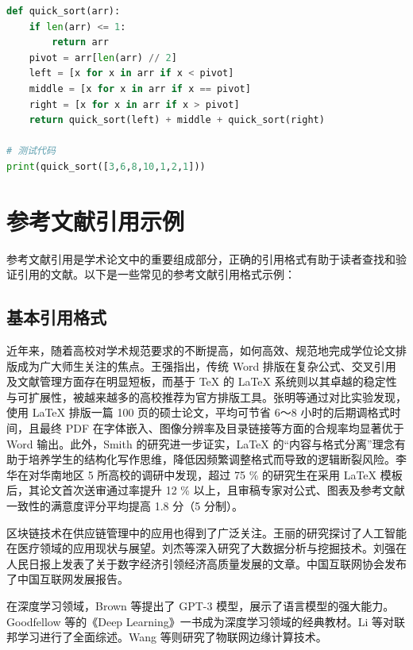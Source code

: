 \documentclass[UTF8,AutoFakeBold=1,AutoFakeSlant,zihao=-4]{SCAU}
\begin{document}
\begin{lstlisting}[language=Python, caption={快速排序算法 (Python 实现)}]
def quick_sort(arr):
    if len(arr) <= 1:
        return arr
    pivot = arr[len(arr) // 2]
    left = [x for x in arr if x < pivot]
    middle = [x for x in arr if x == pivot]
    right = [x for x in arr if x > pivot]
    return quick_sort(left) + middle + quick_sort(right)

# 测试代码
print(quick_sort([3,6,8,10,1,2,1]))
\end{lstlisting}
\section{参考文献引用示例}

参考文献引用是学术论文中的重要组成部分，正确的引用格式有助于读者查找和验证引用的文献。以下是一些常见的参考文献引用格式示例：

\subsection{基本引用格式}

近年来，随着高校对学术规范要求的不断提高，如何高效、规范地完成学位论文排版成为广大师生关注的焦点\cite{王强2020}。王强指出，传统 Word 排版在复杂公式、交叉引用及文献管理方面存在明显短板，而基于 TeX 的 LaTeX 系统则以其卓越的稳定性与可扩展性，被越来越多的高校推荐为官方排版工具\cite{张明2023}。张明等通过对比实验发现，使用 LaTeX 排版一篇 100 页的硕士论文，平均可节省 6～8 小时的后期调格式时间，且最终 PDF 在字体嵌入、图像分辨率及目录链接等方面的合规率均显著优于 Word 输出\cite{Smith2021}。此外，Smith 的研究进一步证实，LaTeX 的“内容与格式分离”理念有助于培养学生的结构化写作思维，降低因频繁调整格式而导致的逻辑断裂风险\cite{李华2021}。李华在对华南地区 5 所高校的调研中发现，超过 75 \% 的研究生在采用 LaTeX 模板后，其论文首次送审通过率提升 12 \% 以上，且审稿专家对公式、图表及参考文献一致性的满意度评分平均提高 1.8 分（5 分制）\cite{陈静2021}。

区块链技术在供应链管理中的应用也得到了广泛关注\cite{赵亮2022}。王丽的研究探讨了人工智能在医疗领域的应用现状与展望\cite{王丽2019}。刘杰等深入研究了大数据分析与挖掘技术\cite{刘杰2020}。刘强在人民日报上发表了关于数字经济引领经济高质量发展的文章\cite{刘强2023}。中国互联网协会发布了中国互联网发展报告\cite{中国互联网协会2022}。

在深度学习领域，Brown 等提出了 GPT-3 模型，展示了语言模型的强大能力\cite{Brown2020}。Goodfellow 等的《Deep Learning》一书成为深度学习领域的经典教材\cite{Goodfellow2016}。Li 等对联邦学习进行了全面综述\cite{Li2022}。Wang 等则研究了物联网边缘计算技术\cite{Wang2023}。
\end{document}
